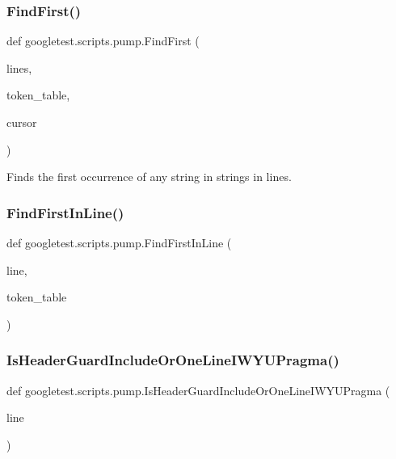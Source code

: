 \subsubsection{\texorpdfstring{FindFirst()}{FindFirst()}}
{\footnotesize\ttfamily def googletest.\+scripts.\+pump.\+Find\+First (\begin{DoxyParamCaption}\item[{}]{lines,  }\item[{}]{token\+\_\+table,  }\item[{}]{cursor }\end{DoxyParamCaption})}

\begin{DoxyVerb}Finds the first occurrence of any string in strings in lines.\end{DoxyVerb}
 \mbox{\label{namespacegoogletest_1_1scripts_1_1pump_a6a0fa99653fbe6b626e3775e62d5a6a3}} 
\subsubsection{\texorpdfstring{FindFirstInLine()}{FindFirstInLine()}}
{\footnotesize\ttfamily def googletest.\+scripts.\+pump.\+Find\+First\+In\+Line (\begin{DoxyParamCaption}\item[{}]{line,  }\item[{}]{token\+\_\+table }\end{DoxyParamCaption})}

\mbox{\label{namespacegoogletest_1_1scripts_1_1pump_a682135b6c619b01b1f3e5fdfab227950}} 
\subsubsection{\texorpdfstring{IsHeaderGuardIncludeOrOneLineIWYUPragma()}{IsHeaderGuardIncludeOrOneLineIWYUPragma()}}
{\footnotesize\ttfamily def googletest.\+scripts.\+pump.\+Is\+Header\+Guard\+Include\+Or\+One\+Line\+I\+W\+Y\+U\+Pragma (\begin{DoxyParamCaption}\item[{}]{line }\end{DoxyParamCaption})}

